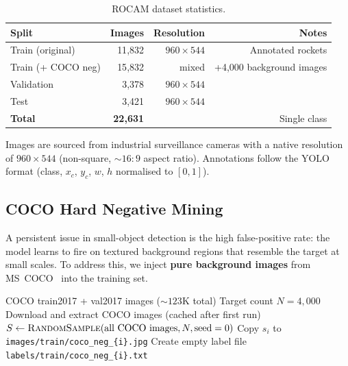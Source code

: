 \documentclass[11pt, a4paper]{article}
\begin{document}
\begin{table}[h]
  \centering
  \caption{ROCAM dataset statistics.}
  \label{tab:dataset}
  \begin{tabular}{@{}lrrr@{}}
    \toprule
    \textbf{Split}     & \textbf{Images}   & \textbf{Resolution} & \textbf{Notes}             \\
    \midrule
    Train (original)   & 11{,}832          & $960{\times}544$    & Annotated rockets          \\
    Train (+ COCO neg) & 15{,}832          & mixed               & +4{,}000 background images \\
    Validation         & 3{,}378           & $960{\times}544$    &                            \\
    Test               & 3{,}421           & $960{\times}544$    &                            \\
    \midrule
    \textbf{Total}     & \textbf{22{,}631} &                     & Single class               \\
    \bottomrule
  \end{tabular}
\end{table}

Images are sourced from industrial surveillance cameras with a native
resolution of $960{\times}544$ (non-square, $\sim\!16{:}9$ aspect ratio).
Annotations follow the YOLO format (class, $x_c$, $y_c$, $w$, $h$ normalised to
$[0,1]$).

\subsection{COCO Hard Negative Mining}
\label{sec:coco_neg}

A persistent issue in small-object detection is the high false-positive rate:
the model learns to fire on textured background regions that resemble the
target at small scales. To address this, we inject \textbf{pure background
  images} from MS~COCO~\cite{lin2014coco} into the training set.

\begin{algorithm}[h]
  \caption{COCO Hard Negative Mining Pipeline}
  \label{alg:coco}
  \begin{algorithmic}[1]
    \Require COCO train2017 + val2017 images (${\sim}123$K total)
    \Require Target count $N = 4{,}000$
    \State Download and extract COCO images (cached after first run)
    \State $S \gets \textsc{RandomSample}(\text{all COCO images}, N, \text{seed}=0)$
    \State Copy $s_i$ to \texttt{images/train/coco\_neg\_\{i\}.jpg}
    \State Create empty label file \texttt{labels/train/coco\_neg\_\{i\}.txt}
    \EndFor
  \end{algorithmic}
\end{algorithm}
\end{document}
